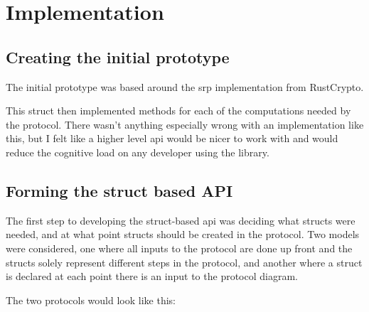 \chapter{Implementation}
\label{chap:impl}

\section{Creating the initial prototype}
The initial prototype was based around the \gls{srp} implementation from RustCrypto.


This struct then implemented methods for each of the computations needed by the protocol.
There wasn't anything especially wrong with an implementation like this, but I felt like a higher level \gls{api} would be nicer to work with and would reduce the cognitive load on any developer using the library.

\section{Forming the struct based API}
The first step to developing the struct-based \gls{api} was deciding what structs were needed, and at what point structs should be created in the protocol.
Two models were considered, one where all inputs to the protocol are done up front and the structs solely represent different steps in the protocol, and another where a struct is declared at each point there is an input to the protocol diagram.

The two protocols would look like this:

